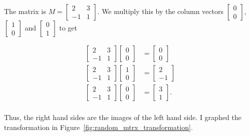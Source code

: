 \documentclass[../gatm_answers.tex]{subfiles}
\begin{document}
The matrix is $M=\begin{bmatrix} 2 & 3 \\ -1 & 1 \end{bmatrix}$. We multiply this by the column vectors $\begin{bmatrix} 0 \\ 0 \end{bmatrix}$, $\begin{bmatrix} 1 \\ 0 \end{bmatrix}$ and $\begin{bmatrix} 0 \\ 1 \end{bmatrix}$ to get

\begin{align*}
\begin{bmatrix} 2 & 3 \\ -1 & 1 \end{bmatrix}\begin{bmatrix} 0 \\ 0 \end{bmatrix} &= \begin{bmatrix} 0 \\ 0 \end{bmatrix} \\
\begin{bmatrix} 2 & 3 \\ -1 & 1 \end{bmatrix}\begin{bmatrix} 1 \\ 0 \end{bmatrix} &= \begin{bmatrix} 2 \\ -1 \end{bmatrix} \\
\begin{bmatrix} 2 & 3 \\ -1 & 1 \end{bmatrix}\begin{bmatrix} 0 \\ 0 \end{bmatrix} &= \begin{bmatrix} 3 \\ 1 \end{bmatrix}. \\
\end{align*}

Thus, the right hand sides are the images of the left hand side. I graphed the transformation in Figure~\ref{fig:random_mtrx_transformation}.
\end{document}
